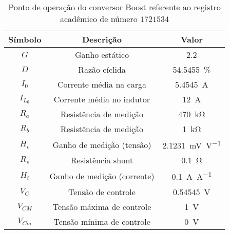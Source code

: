 \begin{table}[!ht]
\centering
\caption{Ponto de operação do conversor Boost referente ao registro acadêmico de número $1721534$}
\label{tab:steadystate}
\begin{tabular}{@{}ccc@{}}
\toprule
\textbf{Símbolo} & \textbf{Descrição} & \textbf{Valor}\\ \midrule
$G$ & Ganho estático & \SI{2.2}{}\\
$D$ & Razão cíclida  & \SI{54.5455}{\%}\\
$I_0$ & Corrente média na carga  & \SI{5.4545}{\A} \\
$I_{L_0}$ & Corrente média no indutor & \SI{12}{\A} \\
$R_a$ & Resistência de medição & \SI{470}{\kilo\ohm} \\
$R_b$ & Resistência de medição & \SI{1}{\kilo\ohm} \\
$H_v$ & Ganho de medição (tensão) & \SI{2.1231}{\milli\V\per\V} \\
$R_s$ & Resistência shunt & \SI{0.1}{\ohm} \\
$H_i$ & Ganho de medição (corrente) & \SI{0.1}{\A\per\A} \\
$V_C$ & Tensão de controle  & \SI{0.54545}{\V} \\
$V_{CM}$ & Tensão máxima de controle  & \SI{1}{\V} \\
$V_{Cm}$ & Tensão mínima de controle  & \SI{0}{\V} \\
\bottomrule
\end{tabular}
\end{table}

